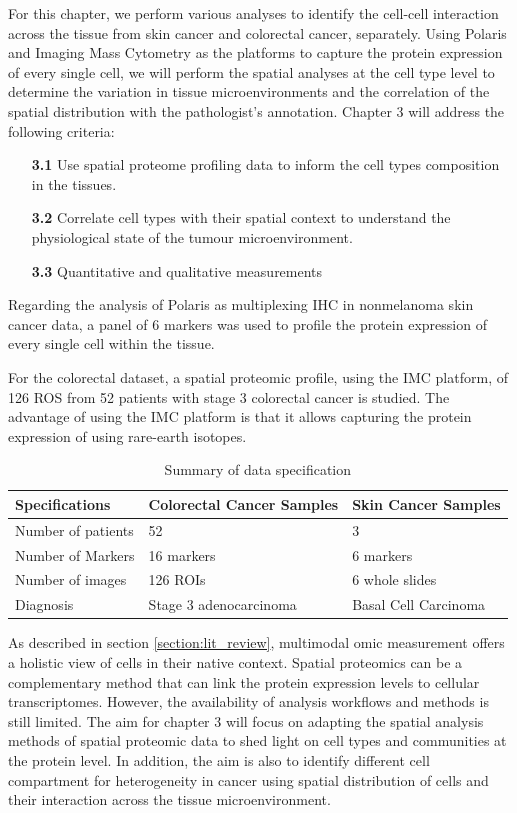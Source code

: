 For this chapter, we perform various analyses to identify the cell-cell interaction across the tissue from skin cancer and colorectal cancer, separately. Using Polaris and Imaging Mass Cytometry as the platforms to capture the protein expression of every single cell, we will perform the spatial analyses at the cell type level to determine the variation in tissue microenvironments and the correlation of the spatial distribution with the pathologist's annotation. Chapter 3 will address the following criteria:    
\begin{enumerate}[align=left]
    \item[\textbf{3.1}] Use spatial proteome profiling data to inform the cell types composition in the tissues.
    \item[\textbf{3.2}] Correlate cell types with their spatial context to understand the physiological state of the tumour microenvironment.
    \item[\textbf{3.3}] Quantitative and qualitative measurements
\end{enumerate}

Regarding the analysis of Polaris as multiplexing IHC in nonmelanoma skin cancer data, a panel of 6 markers was used to profile the protein expression of every single cell within the tissue.  

For the colorectal dataset, a spatial proteomic profile, using the IMC platform, of 126 ROS from 52 patients with stage 3 colorectal cancer is studied. The advantage of using the IMC platform is that it allows capturing the protein expression of using rare-earth isotopes. 

\begin{table}[ht]
\centering
\caption{Summary of data specification}
\begin{tabular}{||P{7cm} || P{3cm} || P{3cm} ||} 
 \hline
 Specifications & Colorectal Cancer Samples & Skin Cancer Samples   \\ [0.33ex] 
 \hline\hline
 Number of patients & 52 & 3   \\ 
 \hline
 Number of Markers & 16 markers & 6 markers  \\ 
 \hline
 Number of images & 126 ROIs &  6 whole slides \\
 \hline
 Diagnosis & Stage 3 adenocarcinoma & Basal Cell Carcinoma  \\ [1ex] 
 \hline
\end{tabular}
\label{table:DataInfor}
\end{table}

As described in section \ref{section:lit_review}, multimodal omic measurement offers a holistic view of cells in their native context. Spatial proteomics can be a complementary method that can link the protein expression levels to cellular transcriptomes. However, the availability of analysis workflows and methods is still limited. The aim for chapter 3 will focus on adapting the spatial analysis methods of spatial proteomic data to shed light on cell types and communities at the protein level. In addition, the aim is also to identify different cell compartment for heterogeneity in cancer using spatial distribution of cells and their interaction across the tissue microenvironment.             

